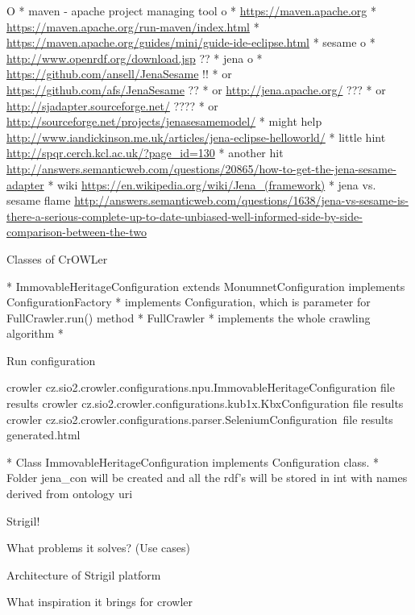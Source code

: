 \begitems \style O
  * maven - apache project managing tool
  \begitems \style o
    * \url{https://maven.apache.org}
    * \url{https://maven.apache.org/run-maven/index.html}
    * \url{https://maven.apache.org/guides/mini/guide-ide-eclipse.html}
  \enditems
  * sesame
  \begitems \style o
    * \url{http://www.openrdf.org/download.jsp} ??
  \enditems
  * jena
  \begitems \style o
    * \url{https://github.com/ansell/JenaSesame} !!
    * or \url{https://github.com/afs/JenaSesame} ??
    * or \url{http://jena.apache.org/} ???
    * or \url{http://sjadapter.sourceforge.net/} ????
    * or \url{http://sourceforge.net/projects/jenasesamemodel/}
    * might help \url{http://www.iandickinson.me.uk/articles/jena-eclipse-helloworld/}
    * little hint \url{http://spqr.cerch.kcl.ac.uk/?page_id=130}
    * another hit \url{http://answers.semanticweb.com/questions/20865/how-to-get-the-jena-sesame-adapter}
    * wiki \url{https://en.wikipedia.org/wiki/Jena_(framework)}
    * jena vs. sesame flame \url{http://answers.semanticweb.com/questions/1638/jena-vs-sesame-is-there-a-serious-complete-up-to-date-unbiased-well-informed-side-by-side-comparison-between-the-two}
  \enditems
\enditems


\secc Classes of CrOWLer

\begitems
  * ImmovableHeritageConfiguration extends MonumnetConfiguration implements ConfigurationFactory 
  \begitems
    * implements Configuration, which is parameter for FullCrawler.run() method
  \enditems
  * FullCrawler
  \begitems
    * implements the whole crawling algorithm
    * 
  \enditems
\enditems

\secc Run configuration 

\begtt
crowler cz.sio2.crowler.configurations.npu.ImmovableHeritageConfiguration file results
crowler cz.sio2.crowler.configurations.kub1x.KbxConfiguration file results
crowler cz.sio2.crowler.configurations.parser.SeleniumConfiguration\
         file results generated.html
\endtt

\begitems
  * Class ImmovableHeritageConfiguration implements Configuration class. 
  * Folder jena\_con will be created and all the rdf's will be stored in int with names derived from ontology uri
\enditems



\sec Strigil!

\secc What problems it solves? (Use cases)

\secc Architecture of Strigil platform

\secc What inspiration it brings for crowler






